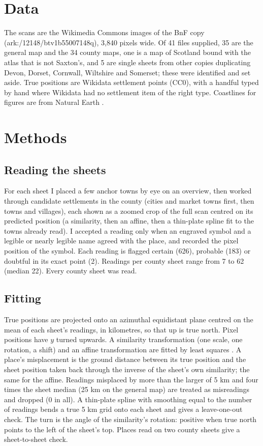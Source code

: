 \documentclass[11pt,a4paper]{article}
\begin{document}
\section{Data}
The scans are the Wikimedia Commons images of the BnF copy (ark:/12148/btv1b55007148q), 3,840 pixels wide. Of 41 files supplied, 35 are the general map and the 34 county maps, one is a map of Scotland bound with the atlas that is not Saxton's, and 5 are single sheets from other copies duplicating Devon, Dorset, Cornwall, Wiltshire and Somerset; these were identified and set aside. True positions are Wikidata settlement points (CC0), with a handful typed by hand where Wikidata had no settlement item of the right type. Coastlines for figures are from Natural Earth \citep{ne}.

\section{Methods}
\subsection{Reading the sheets}
For each sheet I placed a few anchor towns by eye on an overview, then worked through candidate settlements in the county (cities and market towns first, then towns and villages), each shown as a zoomed crop of the full scan centred on its predicted position (a similarity, then an affine, then a thin-plate spline fit to the towns already read). I accepted a reading only when an engraved symbol and a legible or nearly legible name agreed with the place, and recorded the pixel position of the symbol. Each reading is flagged certain (626), probable (183) or doubtful in its exact point (2). Readings per county sheet range from 7 to 62 (median 22). Every county sheet was read.

\subsection{Fitting}
True positions are projected onto an azimuthal equidistant plane centred on the mean of each sheet's readings, in kilometres, so that up is true north. Pixel positions have $y$ turned upwards. A similarity transformation (one scale, one rotation, a shift) and an affine transformation are fitted by least squares \citep{tobler}. A place's misplacement is the ground distance between its true position and the sheet position taken back through the inverse of the sheet's own similarity; the same for the affine. Readings misplaced by more than the larger of 5 km and four times the sheet median (25 km on the general map) are treated as misreadings and dropped (0 in all). A thin-plate spline \citep{bookstein} with smoothing equal to the number of readings bends a true 5 km grid onto each sheet and gives a leave-one-out check. The turn is the angle of the similarity's rotation: positive when true north points to the left of the sheet's top. Places read on two county sheets give a sheet-to-sheet check.
\end{document}
